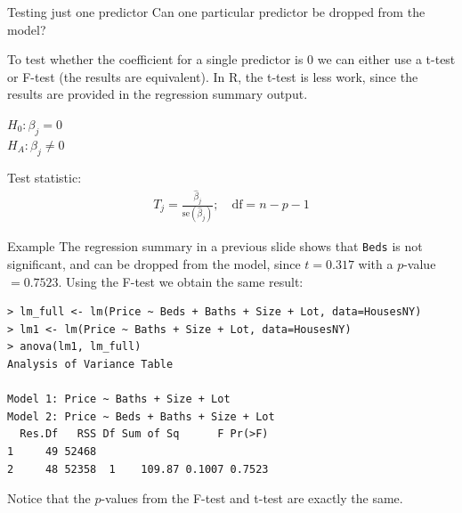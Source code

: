 \documentclass[10pt]{beamer}\usepackage[]{graphicx}\usepackage[]{color}
\newcommand{\se}{\text{se}}
\begin{document}
\begin{frame}{Testing just one predictor}
Can one particular predictor be dropped from the model?\\
\vspace{10pt}

To test whether the coefficient for a single predictor is 0 we can either use a t-test or F-test (the results are equivalent).  In R, the t-test is less work, since the results are provided in the regression summary output.\\
\vspace{10pt}

$H_0: \beta_j = 0$\\
$H_A: \beta_j \neq 0$\\
\vspace{10pt}

Test statistic:
\begin{align*}
T_j = \frac{\hat{\beta}_j}{\se (\hat{\beta}_j)};
\quad \text{df}=n-p-1
\end{align*}
\end{frame}

\begin{frame}[fragile]{Example}
The regression summary in a previous slide shows that \texttt{Beds} is not significant, and can be dropped from the model, since $t=0.317$ with a $p$-value$=0.7523$.  Using the F-test we obtain the same result:\\

\small
\begin{verbatim}
> lm_full <- lm(Price ~ Beds + Baths + Size + Lot, data=HousesNY) 
> lm1 <- lm(Price ~ Baths + Size + Lot, data=HousesNY) 
> anova(lm1, lm_full)
Analysis of Variance Table

Model 1: Price ~ Baths + Size + Lot
Model 2: Price ~ Beds + Baths + Size + Lot
  Res.Df   RSS Df Sum of Sq      F Pr(>F)
1     49 52468                           
2     48 52358  1    109.87 0.1007 0.7523
\end{verbatim}
\normalsize
Notice that the $p$-values from the F-test and t-test are exactly the same.
\end{frame}
\end{document}
